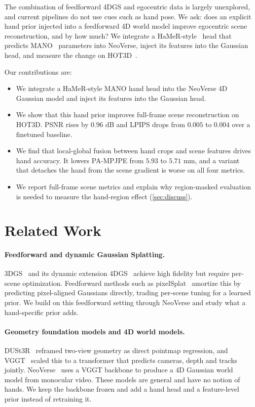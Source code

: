 \documentclass[10pt,twocolumn,letterpaper]{article}
\begin{document}
The combination of feedforward 4DGS and egocentric data is largely unexplored,
and current pipelines do not use cues such as hand pose. We ask: does an explicit
hand prior injected into a feedforward 4D world model improve egocentric scene
reconstruction, and by how much? We integrate a
HaMeR-style~\cite{pavlakos2024hamer} head that predicts
MANO~\cite{romero2017mano} parameters into NeoVerse, inject its features into the
Gaussian head, and measure the change on HOT3D~\cite{banerjee2024hot3d}.

Our contributions are:
\begin{itemize}
  \itemsep0.15em
  \item We integrate a HaMeR-style MANO hand head into the NeoVerse 4D Gaussian
  model and inject its features into the Gaussian head.
  \item We show that this hand prior improves full-frame scene reconstruction on
  HOT3D. PSNR rises by $0.96$ dB and LPIPS drops from $0.005$ to $0.004$ over a
  finetuned baseline.
  \item We find that local-global fusion between hand crops and scene features
  drives hand accuracy. It lowers PA-MPJPE from $5.93$ to $5.71$ mm, and a variant
  that detaches the hand from the scene gradient is worse on all four metrics.
  \item We report full-frame scene metrics and explain why region-masked
  evaluation is needed to measure the hand-region effect (\cref{sec:discuss}).
\end{itemize}

\section{Related Work}
\label{sec:related}

\paragraph{Feedforward and dynamic Gaussian Splatting.}
3DGS~\cite{kerbl20233d} and its dynamic extension 4DGS~\cite{wu20244d} achieve
high fidelity but require per-scene optimization. Feedforward methods such as
pixelSplat~\cite{charatan2024pixelsplat} amortize this by predicting
pixel-aligned Gaussians directly, trading per-scene tuning for a learned prior.
We build on this feedforward setting through NeoVerse and study what a
hand-specific prior adds.

\paragraph{Geometry foundation models and 4D world models.}
DUSt3R~\cite{wang2024dust3r} reframed two-view geometry as direct pointmap
regression, and VGGT~\cite{wang2025vggt} scaled this to a transformer that
predicts cameras, depth and tracks jointly. NeoVerse~\cite{yang2026neoverse}
uses a VGGT backbone to produce a 4D Gaussian world model from monocular video.
These models are general and have no notion of hands. We keep the backbone frozen
and add a hand head and a feature-level prior instead of retraining it.
\end{document}
